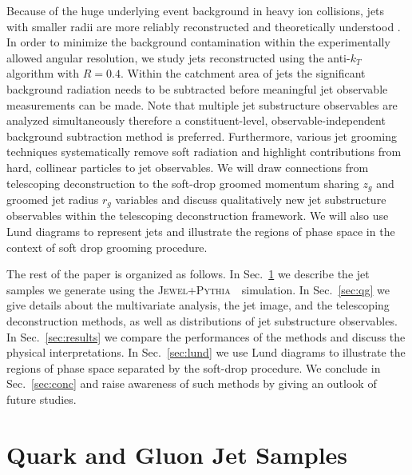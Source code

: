 \documentclass[notoc]{JHEP3}
\newcommand{\jwpy}{\textsc{Jewel+Pythia}~}
\begin{document}
Because of the huge underlying event background in heavy ion collisions, jets with smaller radii are more reliably reconstructed and theoretically understood \cite{Dasgupta:2014yra,Chien:2015cka,Becher:2015hka,Kang:2016mcy}. In order to minimize the background contamination within the experimentally allowed angular resolution, we study jets reconstructed using the anti-$k_T$ algorithm \cite{Cacciari:2008gp} with $R=0.4$. Within the catchment area of jets the significant background radiation needs to be subtracted before meaningful jet observable measurements can be made. Note that multiple jet substructure observables are analyzed simultaneously therefore a constituent-level, observable-independent background subtraction method \cite{Berta:2014eza,Komiske:2017ubm} is preferred. Furthermore, various jet grooming techniques \cite{Ellis:2009su,Ellis:2009me,Krohn:2009th,Dasgupta:2013ihk,Larkoski:2014wba} systematically remove soft radiation and highlight contributions from hard, collinear particles to jet observables. We will draw connections from telescoping deconstruction to the soft-drop groomed momentum sharing $z_g$ and groomed jet radius $r_g$ variables \cite{Larkoski:2014wba} and discuss qualitatively new jet substructure observables within the telescoping deconstruction framework. We will also use Lund diagrams \cite{Andersson1989,Salam:2016yht} to represent jets and illustrate the regions of phase space in the context of soft drop grooming procedure.

The rest of the paper is organized as follows. In Sec.~\ref{sec:sample} we describe the jet samples we generate using the \jwpy ~simulation. In Sec.~\ref{sec:qg} we give details about the multivariate analysis, the jet image, and the telescoping deconstruction methods, as well as distributions of jet substructure observables. In Sec.~\ref{sec:results} we compare the performances of the methods and discuss the physical interpretations. In Sec.~\ref{sec:lund} we use Lund diagrams to illustrate the regions of phase space separated by the soft-drop procedure. We conclude in Sec.~\ref{sec:conc} and raise awareness of such methods by giving an outlook of future studies.



\section{Quark and Gluon Jet Samples}
\label{sec:sample}
\end{document}
